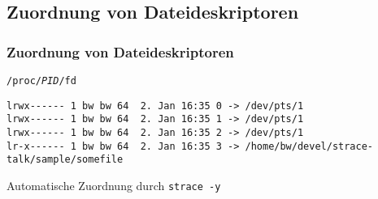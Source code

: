 \subsection{Zuordnung von Dateideskriptoren}

\begin{frame}[fragile]
  \frametitle{Zuordnung von Dateideskriptoren}

  \begin{exampleblock}{\texttt{/proc/\emph{PID}/fd}}
    \begin{lstlisting}
lrwx------ 1 bw bw 64  2. Jan 16:35 0 -> /dev/pts/1
lrwx------ 1 bw bw 64  2. Jan 16:35 1 -> /dev/pts/1
lrwx------ 1 bw bw 64  2. Jan 16:35 2 -> /dev/pts/1
lr-x------ 1 bw bw 64  2. Jan 16:35 3 -> /home/bw/devel/strace-talk/sample/somefile
    \end{lstlisting}
  \end{exampleblock}

  \begin{block}{Automatische Zuordnung durch \strace{}}
    \texttt{strace -y}
  \end{block}

\end{frame}